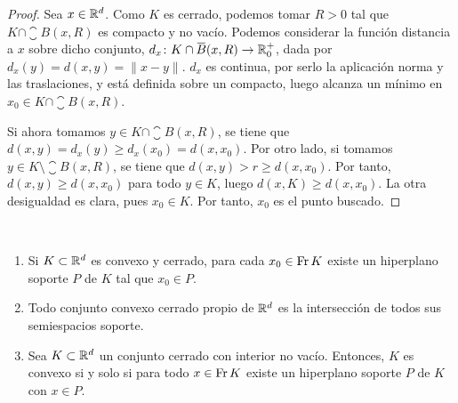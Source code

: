 \begin{proof}
    Sea $x \in \mathbb{R}^d$. Como $K$ es cerrado, podemos tomar $R > 0$ tal que $K \cap \closure{B}(x,R)$ es compacto y no vacío. Podemos considerar la función distancia a $x$ sobre dicho conjunto, $d_x \colon K \cap \closure{B}(x,R) \to \R^+_0$, dada por $d_x(y) = d(x,y) = \|x-y\|$. $d_x$ es continua, por serlo la aplicación norma y las traslaciones, y está definida sobre un compacto, luego alcanza un mínimo en $x_0 \in K \cap \closure{B}(x,R)$.

    Si ahora tomamos $y \in K\cap\closure{B}(x,R)$, se tiene que $d(x,y) = d_x(y) \ge d_x(x_0) = d(x,x_0)$. Por otro lado, si tomamos $y \in K \setminus \closure{B}(x,R)$, se tiene que $d(x,y) > r \ge d(x,x_0)$. Por tanto, $d(x,y) \ge d(x,x_0)$ para todo $y \in K$, luego $d(x,K) \ge d(x,x_0)$. La otra desigualdad es clara, pues $x_0 \in K$. Por tanto, $x_0$ es el punto buscado.
\end{proof}

\begin{thm}~ \label{thm:support_hyperplane}
    \begin{enumerate}
        \item Si $K \subset \mathbb{R}^d$ es convexo y cerrado, para cada $x_0 \in \operatorname{Fr} K$ existe un hiperplano soporte $P$ de $K$ tal que $x_0 \in P$. \label{item:thm_supp:1}
        \item Todo conjunto convexo cerrado propio de $\mathbb{R}^d$ es la intersección de todos sus semiespacios soporte. \label{item:thm_supp:2}
        \item Sea $K \subset \mathbb{R}^d$ un conjunto cerrado con interior no vacío. Entonces, $K$ es convexo si y solo si para todo $x \in \operatorname{Fr} K$ existe un hiperplano soporte $P$ de $K$ con $x \in P$. \label{item:thm_supp:3}
    \end{enumerate}
\end{thm}

